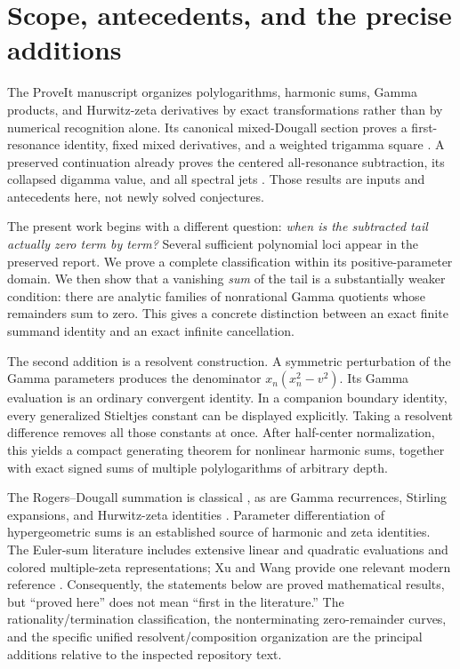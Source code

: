 \documentclass[11pt,a4paper]{article}
\numberwithin{equation}{section}
\theoremstyle{definition}\newtheorem{definition}[theorem]{Definition}
\theoremstyle{remark}\newtheorem{remark}[theorem]{Remark}
\begin{document}
\section{Scope, antecedents, and the precise additions}
\label{sec:scope}
The ProveIt manuscript organizes polylogarithms, harmonic sums, Gamma
products, and Hurwitz-zeta derivatives by exact transformations rather
than by numerical recognition alone. Its canonical mixed-Dougall section
proves a first-resonance identity, fixed mixed derivatives, and a weighted
trigamma square \cite{repo-mixed}. A preserved continuation already proves
the centered all-resonance subtraction, its collapsed digamma value, and
all spectral jets \cite{repo-centered}. Those results are inputs and
antecedents here, not newly solved conjectures.

The present work begins with a different question: \emph{when is the
subtracted tail actually zero term by term?} Several sufficient polynomial
loci appear in the preserved report. We prove a complete classification
within its positive-parameter domain. We then show that a vanishing
\emph{sum} of the tail is a substantially weaker condition: there are
analytic families of nonrational Gamma quotients whose remainders sum
to zero. This gives a concrete distinction between an exact finite
summand identity and an exact infinite cancellation.

The second addition is a resolvent construction. A symmetric perturbation
of the Gamma parameters produces the denominator
$x_n(x_n^2-v^2)$. Its Gamma evaluation is an ordinary convergent
identity. In a companion boundary identity, every generalized Stieltjes
constant can be displayed explicitly. Taking a resolvent difference
removes all those constants at once. After half-center normalization,
this yields a compact generating theorem for nonlinear harmonic sums,
together with exact signed sums of multiple polylogarithms of arbitrary
depth.

The Rogers--Dougall summation is classical \cite{dlmf16}, as are Gamma
recurrences, Stirling expansions, and Hurwitz-zeta identities
\cite{dlmf5,dlmf25}. Parameter differentiation of hypergeometric sums
is an established source of harmonic and zeta identities. The Euler-sum
literature includes extensive linear and quadratic evaluations and
colored multiple-zeta representations; Xu and Wang provide one relevant
modern reference \cite{xu-wang}. Consequently, the statements below are
proved mathematical results, but ``proved here'' does not mean
``first in the literature.'' The rationality/termination classification,
the nonterminating zero-remainder curves, and the specific unified
resolvent/composition organization are the principal additions relative
to the inspected repository text.
\end{document}
